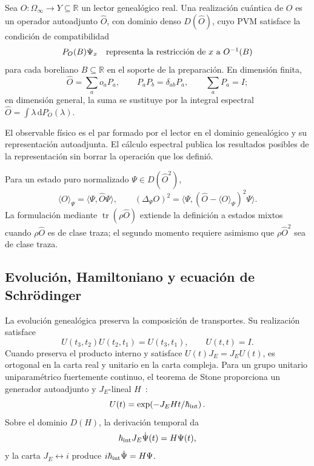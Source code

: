 Sea \(O:\Omega_\infty\to Y\subseteq\mathbb R\) un lector genealógico real.
Una realización cuántica de \(O\) es un operador autoadjunto
\(\widehat O\), con dominio denso \(D(\widehat O)\), cuyo PVM satisface la
condición de compatibilidad
\[
 P_O(B)\Psi_x
 \quad\hbox{representa la restricción de \(x\) a \(O^{-1}(B)\)}
\]
para cada boreliano \(B\subseteq\mathbb R\) en el soporte de la preparación.
En dimensión finita,
\[
 \widehat O=\sum_a o_a P_a,
 \qquad
 P_a P_b=\delta_{ab}P_a,
 \qquad
 \sum_a P_a=I;
\]
en dimensión general, la suma se sustituye por la integral espectral
\(\widehat O=\int\lambda\,\mathrm dP_O(\lambda)\).

\begin{principle}
El observable físico es el par formado por el lector en el dominio
genealógico y su representación autoadjunta. El cálculo espectral publica los
resultados posibles de la representación sin borrar la operación que los
definió.
\end{principle}

Para un estado puro normalizado \(\Psi\in D(\widehat O^2)\),
\[
 \langle O\rangle_\Psi
 =\langle\Psi,\widehat O\Psi\rangle,
 \qquad
 (\Delta_\Psi O)^2
 =\langle\Psi,(\widehat O-\langle O\rangle_\Psi)^2\Psi\rangle.
\]
La formulación mediante \(\operatorname{tr}(\rho\widehat O)\) extiende la
definición a estados mixtos cuando \(\rho\widehat O\) es de clase traza; el
segundo momento requiere asimismo que
\(\rho\widehat O^2\) sea de clase traza.

\subsection{Evolución, Hamiltoniano y ecuación de Schrödinger}

La evolución genealógica preserva la composición de transportes. Su
realización satisface
\[
 U(t_3,t_2)U(t_2,t_1)=U(t_3,t_1),
 \qquad U(t,t)=I.
\]
Cuando preserva el producto interno y satisface
\(U(t)J_E=J_EU(t)\), es ortogonal en la carta real y unitario en la carta
compleja. Para un grupo unitario uniparamétrico fuertemente continuo, el
teorema de Stone proporciona un generador autoadjunto y \(J_E\)-lineal
\(H\)~\cite{Stone1932}:
\[
 U(t)=\exp\!\left(-J_E H t/\hbar_{\rm int}\right).
\]
Sobre el dominio \(D(H)\), la derivación temporal da
\begin{equation}
 \hbar_{\rm int}J_E\dot\Psi(t)=H\Psi(t),
 \label{eq:schrodinger-genealogico-rev2}
\end{equation}
y la carta \(J_E\leftrightarrow i\) produce
\(i\hbar_{\rm int}\dot\Psi=H\Psi\).

